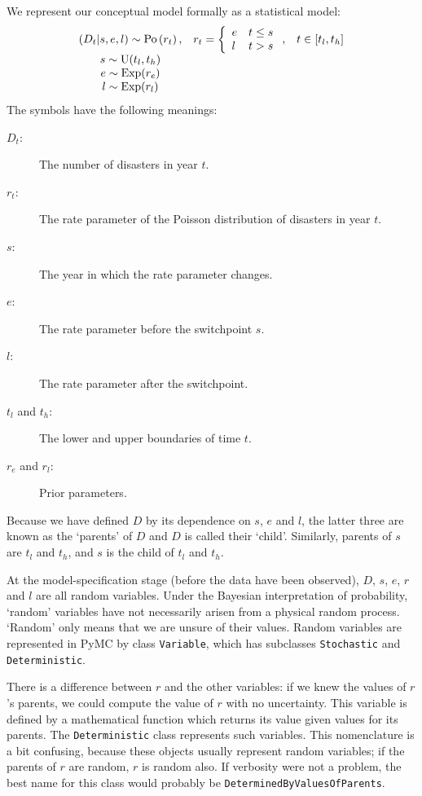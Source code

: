 We represent our conceptual model formally as a statistical model:
\begin{equation}
    \begin{array}{ccc}
        (D_t | s, e, l) \sim \textup{Po}\left(r_t\right), & r_t=\left\{\begin{array}{ll}
            e & t\le s\\ l & t>s
            \end{array}\right.,&t\in[t_l,t_h]\\
        s\sim \textup{U}(t_l, t_h)\\
        e\sim \textup{Exp}(r_e)\\
        l\sim \textup{Exp}(r_l)        
    \end{array}
    \label{disastermodel} 
\end{equation}
The symbols have the following meanings:
\begin{description}
    \item[$D_t$:] The number of disasters in year $t$.
    \item[$r_t$:] The rate parameter of the Poisson distribution of disasters in year $t$.
    \item[$s$:] The year in which the rate parameter changes.
    \item[$e$:] The rate parameter before the switchpoint $s$.
    \item[$l$:] The rate parameter after the switchpoint.
    \item[$t_l$ and $t_h$:] The lower and upper boundaries of time $t$.
    \item[$r_e$ and $r_l$:] Prior parameters.
\end{description}
Because we have defined $D$ by its dependence on $s$, $e$ and $l$, the latter three are known as the `parents' of $D$ and $D$ is called their `child'. Similarly, parents of $s$ are $t_l$ and $t_h$, and $s$ is the child of $t_l$ and $t_h$.

At the model-specification stage (before the data have been observed), $D$, $s$, $e$, $r$ and $l$ are all random variables. Under the Bayesian interpretation of probability, `random' variables have not necessarily arisen from a physical random process. `Random' only means that we are unsure of their values. Random variables are represented in PyMC by class \texttt{Variable}, which has subclasses \texttt{Stochastic} and \texttt{Deterministic}.

There is a difference between $r$ and the other variables: if we knew the values of $r$'s parents, we could compute the value of $r$ with no uncertainty. This variable is defined by a mathematical function which returns its value given values for its parents. The \texttt{Deterministic} class represents such variables. This nomenclature is a bit confusing, because these objects usually represent random variables; if the parents of $r$ are random, $r$ is random also. If verbosity were not a problem, the best name for this class would probably be \texttt{DeterminedByValuesOfParents}.

